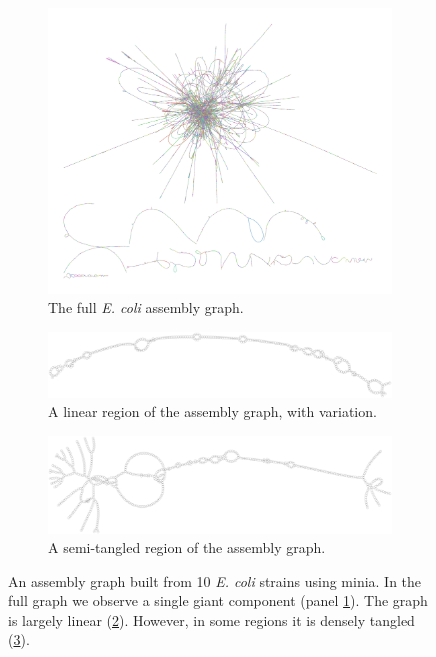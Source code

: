 \documentclass[a4paper,12pt,numbered,oneside]{Classes/PhDThesisPSnPDF}
\begin{document}
\begin{figure}[htbp!]
  \centering
  \begin{subfigure}[t]{1.0\textwidth}
    \includegraphics[width=1.0\textwidth]{Chapter3/Figs/ecoli_10strain_kmer51abund10_contigs_vg_gfa.png}
    \caption{The full \emph{E. coli} assembly graph.}
    \label{subfig:ecoli_pangenome_bandage}
  \end{subfigure}
  \begin{subfigure}[t]{0.7\textwidth}
    \includegraphics[width=1.0\textwidth]{Chapter3/Figs/ecoli_n298051_c100.pdf}
    \caption{A linear region of the assembly graph, with variation.}
    \label{subfig:ecoli_pangenome_linear}
  \end{subfigure}
  \begin{subfigure}[t]{0.7\textwidth}
    \includegraphics[width=1.0\textwidth]{Chapter3/Figs/ecoli_n213909_c100.pdf}
    \caption{A semi-tangled region of the assembly graph.}
    \label{subfig:ecoli_pangenome_tangle}
  \end{subfigure}
  \caption[An \emph{E. coli} pangenome]{
    An assembly graph built from 10 \emph{E. coli} strains using minia.
    In the full graph we observe a single giant component (panel \ref{subfig:ecoli_pangenome_bandage}).
    The graph is largely linear (\ref{subfig:ecoli_pangenome_linear}).
    However, in some regions it is densely tangled (\ref{subfig:ecoli_pangenome_tangle}).
  }
  \label{fig:ecoli_pangenome}
\end{figure}
\end{document}
